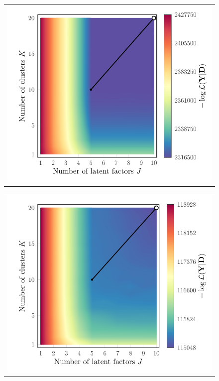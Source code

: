 \documentclass[twocolumn]{aastex62}
\begin{document}
\begin{figure}
	\centering
	\begin{tabular}[b]{@{}p{}@{}}
		\centering\includegraphics[width=\linewidth]{experiments/eval-figs/eval-1-gridsearch-ll-contours.pdf} \\
	\end{tabular}
	\begin{tabular}[b]{@{}p{}@{}}
		\centering\includegraphics[width=\linewidth]{experiments/eval-figs/eval-2-gridsearch-ll-contours.pdf} \\
	\end{tabular}


\end{figure}
\end{document}
